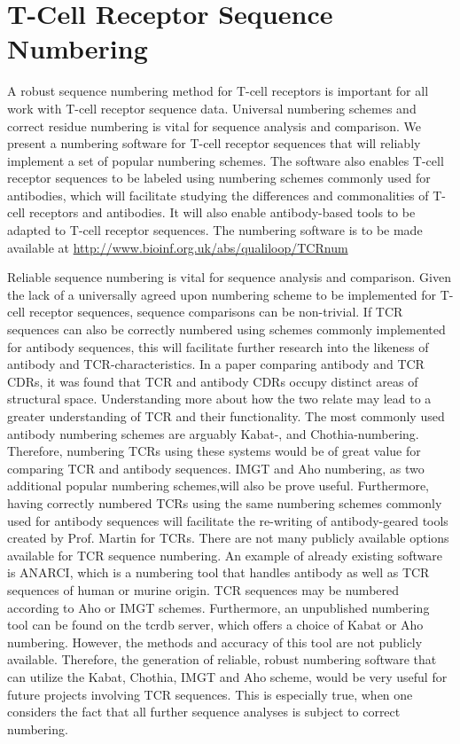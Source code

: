 \chapter{T-Cell Receptor Sequence Numbering}
\label{chapterlabel1}
A robust sequence numbering method for T-cell receptors is important for all work with T-cell receptor sequence data. Universal numbering schemes and correct residue numbering is vital for sequence analysis and comparison. We present a numbering software for T-cell receptor sequences that will reliably implement a set of popular numbering schemes. The software also enables T-cell receptor sequences to be labeled using numbering schemes commonly used for antibodies, which will facilitate studying the differences and commonalities of T-cell receptors and antibodies. It will also enable antibody-based tools to be adapted to T-cell receptor sequences. The numbering software is to be made available at \url{http://www.bioinf.org.uk/abs/qualiloop/TCRnum}


Reliable sequence numbering is vital for sequence analysis and comparison. Given the lack of a universally agreed upon numbering scheme to be implemented for T-cell receptor sequences, sequence comparisons can be non-trivial. 
If TCR sequences can also be correctly numbered using schemes commonly implemented for antibody sequences, this will facilitate further research into the likeness of antibody and TCR-characteristics. 
In a paper comparing antibody and TCR CDRs,\cite{Wong2019} it was found that TCR and antibody CDRs occupy distinct areas of structural space. Understanding more about how the two relate may lead to a greater understanding of TCR and their functionality. 
The most commonly used antibody numbering schemes are arguably Kabat-, and Chothia-numbering. Therefore, numbering TCRs using these systems would be of great value for comparing TCR and antibody sequences. IMGT and Aho numbering, as two additional popular numbering schemes,will also be prove useful. 
Furthermore, having correctly numbered TCRs using the same numbering schemes commonly used for antibody sequences will facilitate the re-writing of antibody-geared tools created by Prof. Martin for TCRs. 
There are not many publicly available options available for TCR sequence numbering. An example of already existing software is ANARCI\cite{Dunbar2016}, which is a numbering tool that handles antibody as well as TCR sequences of human or murine origin. TCR sequences may be numbered according to Aho or IMGT schemes.  Furthermore, an unpublished numbering tool can be found on the tcrdb server\cite{Chen2021}, which offers a choice of Kabat or Aho numbering. However, the methods and accuracy of this tool are not publicly available. Therefore, the generation of reliable, robust numbering software that can utilize the Kabat, Chothia, IMGT and Aho scheme, would be very useful for future projects involving TCR sequences. This is especially true, when one considers the fact that all further sequence analyses is subject to correct numbering.

